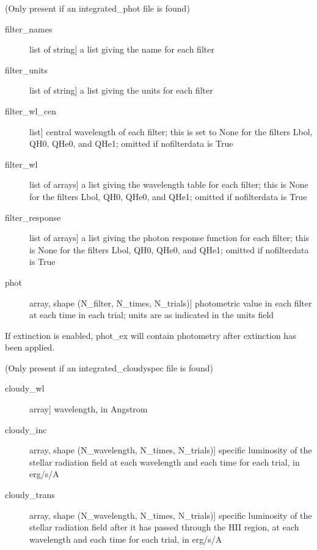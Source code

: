 \documentclass[letterpaper,10pt,english]{sphinxmanual}
\begin{document}
\begin{fulllineitems}
\begin{description}
\begin{description}
\end{description}

(Only present if an integrated\_phot file is found)
\begin{description}
\item[{filter\_names}] \leavevmode{[}list of string{]}
a list giving the name for each filter

\item[{filter\_units}] \leavevmode{[}list of string{]}
a list giving the units for each filter

\item[{filter\_wl\_cen}] \leavevmode{[}list{]}
central wavelength of each filter; this is set to None for the
filters Lbol, QH0, QHe0, and QHe1; omitted if nofilterdata is
True

\item[{filter\_wl}] \leavevmode{[}list of arrays{]}
a list giving the wavelength table for each filter; this is
None for the filters Lbol, QH0, QHe0, and QHe1; omitted if
nofilterdata is True

\item[{filter\_response}] \leavevmode{[}list of arrays{]}
a list giving the photon response function for each filter;
this is None for the filters Lbol, QH0, QHe0, and QHe1; omitted
if nofilterdata is True

\item[{phot}] \leavevmode{[}array, shape (N\_filter, N\_times, N\_trials){]}
photometric value in each filter at each time in each trial;
units are as indicated in the units field

\end{description}

If extinction is enabled, phot\_ex will contain photometry  
after extinction has been applied.

(Only present if an integrated\_cloudyspec file is found)
\begin{description}
\item[{cloudy\_wl}] \leavevmode{[}array{]}
wavelength, in Angstrom

\item[{cloudy\_inc}] \leavevmode{[}array, shape (N\_wavelength, N\_times, N\_trials){]}
specific luminosity of the stellar radiation field at each
wavelength and each time for each trial, in erg/s/A

\item[{cloudy\_trans}] \leavevmode{[}array, shape (N\_wavelength, N\_times, N\_trials){]}
specific luminosity of the stellar radiation field after it has
passed through the HII region, at each wavelength and each time
for each trial, in erg/s/A


\end{description}
\end{description}
\end{fulllineitems}
\end{document}
